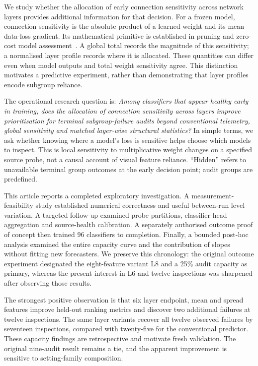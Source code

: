 \documentclass[nolineno]{ieeeaccess}
\begin{document}
We study whether the allocation of early connection sensitivity across network layers provides additional information for that decision. For a frozen model, connection sensitivity is the absolute product of a learned weight and its mean data-loss gradient. Its mathematical primitive is established in pruning and zero-cost model assessment~\cite{snip,zerocost}. A global total records the magnitude of this sensitivity; a normalised layer profile records where it is allocated. These quantities can differ even when model outputs and total weight sensitivity agree. This distinction motivates a predictive experiment, rather than demonstrating that layer profiles encode subgroup reliance.

The operational research question is: \emph{Among classifiers that appear healthy early in training, does the allocation of connection sensitivity across layers improve prioritisation for terminal subgroup-failure audits beyond conventional telemetry, global sensitivity and matched layer-wise structural statistics?} In simple terms, we ask whether knowing where a model's loss is sensitive helps choose which models to inspect. This is local sensitivity to multiplicative weight changes on a specified source probe, not a causal account of visual feature reliance. ``Hidden'' refers to unavailable terminal group outcomes at the early decision point; audit groups are predefined.

This article reports a completed exploratory investigation. A measurement-feasibility study established numerical correctness and useful between-run level variation. A targeted follow-up examined probe partitions, classifier-head aggregation and source-health calibration. A separately authorised outcome proof of concept then trained 96 classifiers to completion. Finally, a bounded post-hoc analysis examined the entire capacity curve and the contribution of slopes without fitting new forecasters. We preserve this chronology: the original outcome experiment designated the eight-feature variant L8 and a 25\% audit capacity as primary, whereas the present interest in L6 and twelve inspections was sharpened after observing those results.

The strongest positive observation is that six layer endpoint, mean and spread features improve held-out ranking metrics and discover two additional failures at twelve inspections. The same layer variants recover all twelve observed failures by seventeen inspections, compared with twenty-five for the conventional predictor. These capacity findings are retrospective and motivate fresh validation. The original nine-audit result remains a tie, and the apparent improvement is sensitive to setting-family composition.
\end{document}

